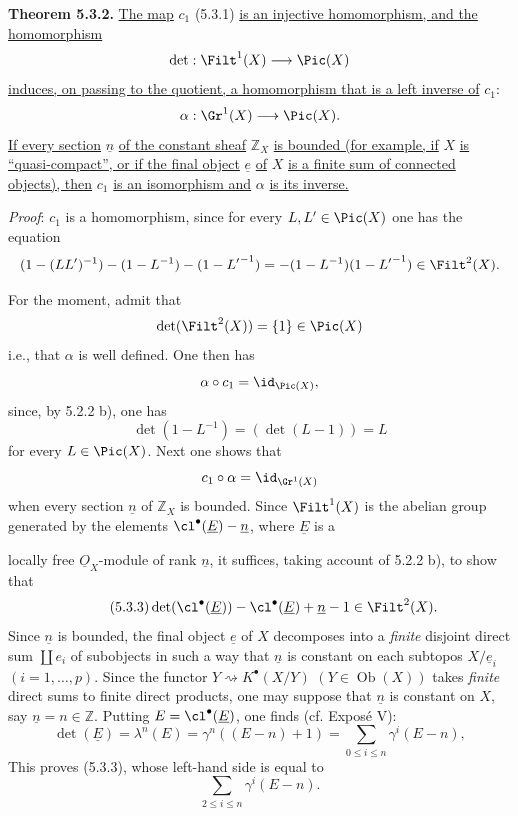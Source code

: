 %

\textbf{Theorem 5.3.2.} \uline{The map} \(c_1\) (5.3.1) \uline{is an injective homomorphism, and the homomorphism}
\[
 \det:\Filt^1(X)\longrightarrow\Pic(X)
\]
\uline{induces, on passing to the quotient, a homomorphism that is a left inverse of} \(c_1\):
\[
 \alpha:\Gr^1(X)\longrightarrow\Pic(X).
\]
\uline{If every section} \(\underline{n}\) \uline{of the constant sheaf} \(\mathbb Z_X\) \uline{is bounded (for example, if} \(X\) \uline{is ``quasi-compact'', or if the final object} \(\underline{e}\) \uline{of} \(X\) \uline{is a finite sum of connected objects), then} \(c_1\) \uline{is an isomorphism and} \(\alpha\) \uline{is its inverse.}

\emph{Proof}: \(c_1\) is a homomorphism, since for every \(L,L'\in\Pic(X)\) one has the equation
\[
 (1-(LL')^{-1})-(1-L^{-1})-(1-{L'}^{-1})
 =
 -(1-L^{-1})(1-{L'}^{-1})\in\Filt^2(X).
\]

For the moment, admit that
\[
 \det(\Filt^2(X))=\{1\}\in\Pic(X)
\]
i.e., that \(\alpha\) is well defined. One then has
\[
 \alpha\circ c_1=\id_{\Pic(X)},
\]
since, by 5.2.2 b), one has
\[
 \det(1-L^{-1})=(\det(L-1))=L
\]
for every \(L\in\Pic(X)\). Next one shows that
\[
 c_1\circ\alpha=\id_{\Gr^1(X)}
\]
when every section \(\underline{n}\) of \(\mathbb Z_X\) is bounded. Since \(\Filt^1(X)\) is the abelian group generated by the elements \(\cl^{\bullet}(\underline{E})-\underline{n}\), where \(\underline{E}\) is a

%

locally free \(\underline{O}_X\)-module of rank \(\underline{n}\), it suffices, taking account of 5.2.2 b), to show that
\begin{equation}\tag{5.3.3}
 \det(\cl^{\bullet}(\underline{E}))-\cl^{\bullet}(\underline{E})+\underline{n}-1\in\Filt^2(X).
\end{equation}
Since \(\underline{n}\) is bounded, the final object \(\underline{e}\) of \(X\) decomposes into a \emph{finite} disjoint direct sum \(\coprod e_i\) of subobjects in such a way that \(\underline{n}\) is constant on each subtopos \(X/\underline{e}_i\) \((i=1,\ldots,p)\). Since the functor \(Y\rightsquigarrow K^{\bullet}(X/Y)\) \((Y\in\operatorname{Ob}(X))\) takes \emph{finite} direct sums to finite direct products, one may suppose that \(\underline n\) is constant on \(X\), say \(\underline n=n\in\mathbb Z\). Putting \(E=\cl^{\bullet}(\underline E)\), one finds (cf. Exposé V):
\[
 \det(\underline{E})=\lambda^n(E)=\gamma^n((E-n)+1)
 =
 \sum_{0\leq i\leq n}\gamma^i(E-n),
\]
This proves (5.3.3), whose left-hand side is equal to
\[
 \sum_{2\leq i\leq n}\gamma^i(E-n).
\]

